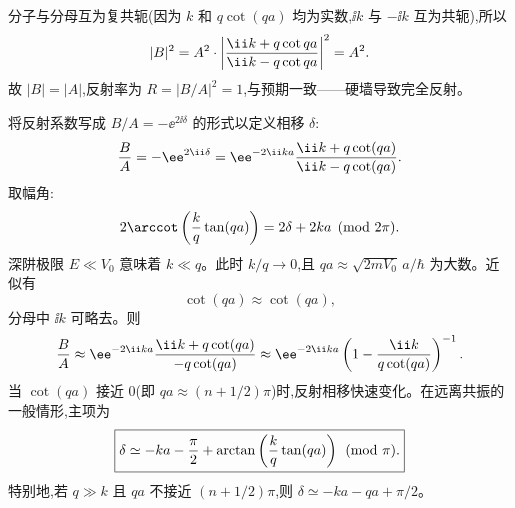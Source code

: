 \begin{question}
\begin{solution}
分子与分母互为复共轭(因为 $k$ 和 $q\cot(qa)$ 均为实数,$\ii k$ 与 $-\ii k$ 互为共轭),所以
\[
|B|^2=A^2\cdot\left|{\ii k+q\cot qa\over\ii k-q\cot qa}\right|^2=A^2.
\]
故 $|B|=|A|$,反射率为 $R=|B/A|^2=1$,与预期一致——硬墙导致完全反射。

将反射系数写成 $B/A=-\ee^{2\ii\delta}$ 的形式以定义相移 $\delta$:
\[
{B\over A}=-\ee^{2\ii\delta}=\ee^{-2\ii ka}{\ii k+q\cot(qa)\over\ii k-q\cot(qa)}.
\]
取幅角:
\[
2\arccot\left({k\over q}\tan(qa)\right)=2\delta+2ka\pmod{2\pi}.
\]
深阱极限 $E\ll V_0$ 意味着 $k\ll q$。此时 $k/q\to0$,且 $qa\approx\sqrt{2mV_0}\,a/\hbar$ 为大数。近似有
\[
\cot(qa)\approx\cot\left(qa\right),
\]
分母中 $\ii k$ 可略去。则
\[
{B\over A}\approx \ee^{-2\ii ka}{\ii k+q\cot(qa)\over -q\cot(qa)}\approx \ee^{-2\ii ka}\left(1-{\ii k\over q\cot(qa)}\right)^{-1}.
\]
当 $\cot(qa)$ 接近 $0$(即 $qa\approx (n+1/2)\pi$)时,反射相移快速变化。在远离共振的一般情形,主项为
\[
\boxed{\delta\simeq -ka-{\pi\over2}+\arctan\left({k\over q}\tan(qa)\right)\pmod{\pi}.}
\]
特别地,若 $q\gg k$ 且 $qa$ 不接近 $(n+1/2)\pi$,则 $\delta\simeq -ka-qa+\pi/2$。
\end{solution}
\end{question}


